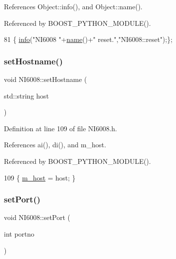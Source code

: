 References Object\+::info(), and Object\+::name().



Referenced by B\+O\+O\+S\+T\+\_\+\+P\+Y\+T\+H\+O\+N\+\_\+\+M\+O\+D\+U\+L\+E().


\begin{DoxyCode}
81 \{ \hyperlink{classObject_a644fd329ea4cb85f54fa6846484b84a8}{info}(\textcolor{stringliteral}{"NI6008 "}+\hyperlink{classObject_a300f4c05dd468c7bb8b3c968868443c1}{name}()+\textcolor{stringliteral}{" reset."},\textcolor{stringliteral}{"NI6008::reset"});\};
\end{DoxyCode}
\mbox{\label{classNI6008_a509a804fa21b9f9f5f959b85d5abf5ba}} 
\subsubsection{\texorpdfstring{set\+Hostname()}{setHostname()}}
{\footnotesize\ttfamily void N\+I6008\+::set\+Hostname (\begin{DoxyParamCaption}\item[{std\+::string}]{host }\end{DoxyParamCaption})\hspace{0.3cm}{\ttfamily [inline]}}



Definition at line 109 of file N\+I6008.\+h.



References ai(), di(), and m\+\_\+host.



Referenced by B\+O\+O\+S\+T\+\_\+\+P\+Y\+T\+H\+O\+N\+\_\+\+M\+O\+D\+U\+L\+E().


\begin{DoxyCode}
109 \{ \hyperlink{classNI6008_ab8b247caa89b1dc9b9c78b0c1b08ed5d}{m\_host} = host; \}
\end{DoxyCode}
\mbox{\label{classNI6008_a6bad72fc5a2edb4e3ac0ff8db3a458fd}} 
\subsubsection{\texorpdfstring{set\+Port()}{setPort()}}
{\footnotesize\ttfamily void N\+I6008\+::set\+Port (\begin{DoxyParamCaption}\item[{int}]{portno }\end{DoxyParamCaption})\hspace{0.3cm}{\ttfamily [inline]}}



